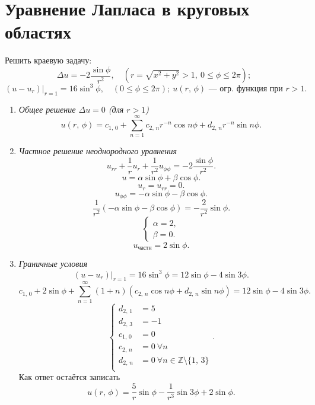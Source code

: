 \documentclass[a4paper]{article}
\begin{document}
\section{Уравнение Лапласа в круговых областях}
\begin{hiProb}[2005/2006 уч.г. №4]
Решить краевую задачу:
\[
	\Delta u= - 2 \frac{\sin \phi}{r^2},\quad \left(r
	=\sqrt{x^2+y^2} >1,\ 0\le  \phi \le  2\pi\right)
;\] 
\[
	\left. (u-u_r) \right|_{r=1}=16 \sin^3 \phi,\quad
		(0 \le \phi \le  2\pi);\ u(r,\,\phi)
		\text{ --- огр. функция при }r>1
.\] 
\end{hiProb}
\begin{sol}
	\begin{enumerate}
		\item 	\emph{Общее решение $\Delta u=0$ (для $r>1$)}
\[
	u(r,\,\phi)= c_{1,\,0} + \sum_{n=1}^{\infty} c_{2,\,n}
	r^{-n} \cos n\phi+ d_{2,\,n}r^{-n} \sin n\phi
.\] 
\item \emph{Частное решение неоднородного уравнения}
\[
u_{rr}+\frac{1}{r} u_r +\frac{1}{r^2} u_{\phi \phi}=
-2 \frac{\sin \phi}{r^2}
.\] 
\[
u=\alpha \sin \phi +\beta \cos \phi
.\] 
\[
u_r=u_{rr}=0
.\] 
\[
u_{\phi \phi}=-\alpha \sin \phi -\beta \cos \phi
.\] 
\[
	\frac{1}{r^2}(-\alpha \sin \phi -\beta \cos \phi)=
	-\frac{2}{r^2}\sin\phi
.\] 
\[
\left\{
\begin{aligned}
\alpha=2,\\
\beta=0.
\end{aligned}
\right.
\] 
\[
u_{\text{частн}}=2 \sin \phi
.\] 
\item \emph{Граничные условия}
\[
\left. 	(u-u_r) \right|_{r=1}=16 \sin^3 \phi=
	12 \sin \phi -4\sin 3\phi
.\] 
\[
	c_{1,\,0} + 2 \sin\phi+\sum_{n=1}^{\infty}(1+n)( c_{2,\,n} \cos n \phi+
	d_{2,\,n} \sin n\phi) =12 \sin \phi -4 \sin3\phi
.\]
\[
\left\{
\begin{aligned}
	d_{2,\,1}&=5\\
	d_{2,\,3}&=-1\\
	c_{1,\,0}&= 0 \\
	c_{2,\,n}&= 0 \ \forall n\\
	d_{2,\,n}&= 0 \ \forall n \in \mathbb{Z}\setminus\{1,\,3\}\\
\end{aligned}
\right.
.\] 
Как ответ остаётся записать
\[
	u(r,\,\phi)=\frac{5}{r} \sin \phi -\frac{1}{r^3} \sin 3\phi+2 \sin \phi
.\] 
	\end{enumerate}
\end{sol}
\end{document}
